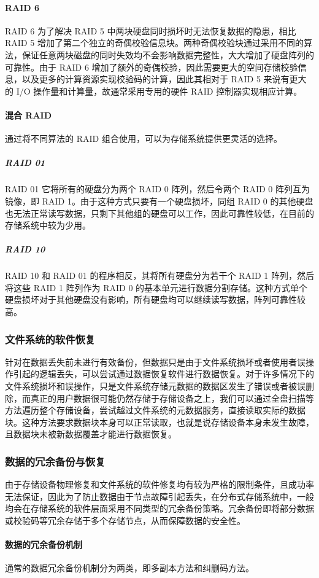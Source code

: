 \paragraph{RAID 6}
RAID 6 为了解决 RAID 5 中两块硬盘同时损坏时无法恢复数据的隐患，相比 RAID 5 增加了第二个独立的奇偶校验信息块。两种奇偶校验块通过采用不同的算法\cite{xie2019n,plank2008raid,feng2010eeo,jin2009p}，保证任意两块磁盘的同时失效均不会影响数据完整性，大大增加了硬盘阵列的可靠性。由于 RAID 6 增加了额外的奇偶校验，因此需要更大的空间存储校验信息，以及更多的计算资源实现校验码的计算，因此其相对于 RAID 5 来说有更大的 I/O 操作量和计算量，故通常采用专用的硬件 RAID 控制器实现相应计算。
\paragraph{混合 RAID}
通过将不同算法的 RAID 组合使用，可以为存储系统提供更灵活的选择。
\subparagraph{RAID 01}
RAID 01 它将所有的硬盘分为两个 RAID 0 阵列，然后令两个 RAID 0 阵列互为镜像，即 RAID 1。由于这种方式只要有一个硬盘损坏，同组 RAID 0 的其他硬盘也无法正常读写数据，只剩下其他组的硬盘可以工作，因此可靠性较低，在目前的存储系统中较为少用。
\subparagraph{RAID 10}
RAID 10 和 RAID 01 的程序相反，其将所有硬盘分为若干个 RAID 1 阵列，然后将这些 RAID 1 阵列作为 RAID 0 的基本单元进行数据分割存储。这种方式单个硬盘损坏对于其他硬盘没有影响，所有硬盘均可以继续读写数据，阵列可靠性较高。
\subsubsection{文件系统的软件恢复}
针对在数据丢失前未进行有效备份，但数据只是由于文件系统损坏或者使用者误操作引起的逻辑丢失，可以尝试通过数据恢复软件进行数据恢复。对于许多情况下的文件系统损坏和误操作，只是文件系统存储元数据的数据区发生了错误或者被误删除，而真正的用户数据很可能仍然存储于存储设备之上，我们可以通过全盘扫描等方法遍历整个存储设备，尝试越过文件系统的元数据服务，直接读取实际的数据块。这种方法要求数据块本身可以正常读取，也就是说存储设备本身未发生故障，且数据块未被新数据覆盖才能进行数据恢复。
\subsubsection{数据的冗余备份与恢复}
由于存储设备物理修复和文件系统的软件修复均有较为严格的限制条件，且成功率无法保证，因此为了防止数据由于节点故障引起丢失，在分布式存储系统中，一般均会在存储系统的软件层面采用不同类型的冗余备份策略。冗余备份即将部分数据或校验码等冗余存储于多个存储节点，从而保障数据的安全性。
\paragraph{数据的冗余备份机制}
通常的数据冗余备份机制分为两类，即多副本方法和纠删码方法\cite{luo2012summary}。

